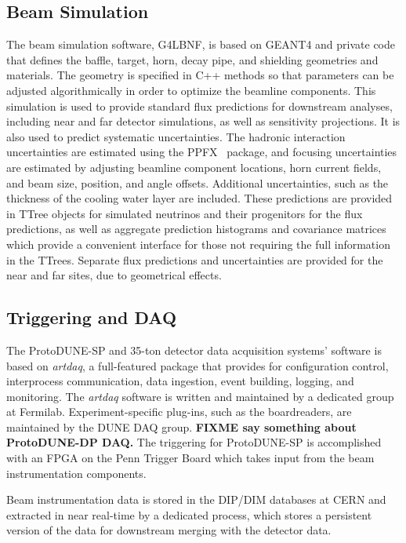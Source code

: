 \subsection{Beam Simulation}

The beam simulation software, G4LBNF, is based on GEANT4 and private code that defines the baffle, target, horn,
decay pipe, and shielding geometries and materials.  The geometry is specified in C++ methods so that parameters
can be adjusted algorithmically in order to optimize the beamline components.  This simulation is used to provide
standard flux predictions for downstream analyses, including near and far detector simulations, as well as
sensitivity projections.  It is also used to predict systematic uncertainties.  The hadronic interaction uncertainties
are estimated using the PPFX~\cite{ppfx} package, and focusing uncertainties are estimated by adjusting 
beamline component locations, horn current fields, and beam size, position, and angle offsets.  Additional
uncertainties, such as the thickness of the cooling water layer are included.  These predictions are provided
in TTree objects for simulated neutrinos and their progenitors for the flux predictions, as well as aggregate
prediction histograms and covariance matrices which provide a convenient interface for those not requiring the
full information in the TTrees.  Separate flux predictions and uncertainties are provided for the near and far
sites, due to geometrical effects.

\subsection{Triggering and DAQ}

The ProtoDUNE-SP and 35-ton detector data acquisition systems'
software is based on {\it artdaq}, a full-featured package that provides
for configuration control, interprocess communication, data ingestion, event building, logging, and monitoring.
The {\it artdaq} software is written and maintained by a dedicated group at Fermilab.  Experiment-specific plug-ins,
such as the boardreaders, are maintained by the DUNE DAQ group.  {\bf FIXME say something about ProtoDUNE-DP DAQ.}
The triggering for ProtoDUNE-SP is accomplished with an FPGA on the Penn Trigger Board which takes input from
the beam instrumentation components. 

Beam instrumentation data is stored in the DIP/DIM databases at CERN and extracted in near real-time by a dedicated
process, which stores a persistent version of the data for downstream merging with the detector data.

